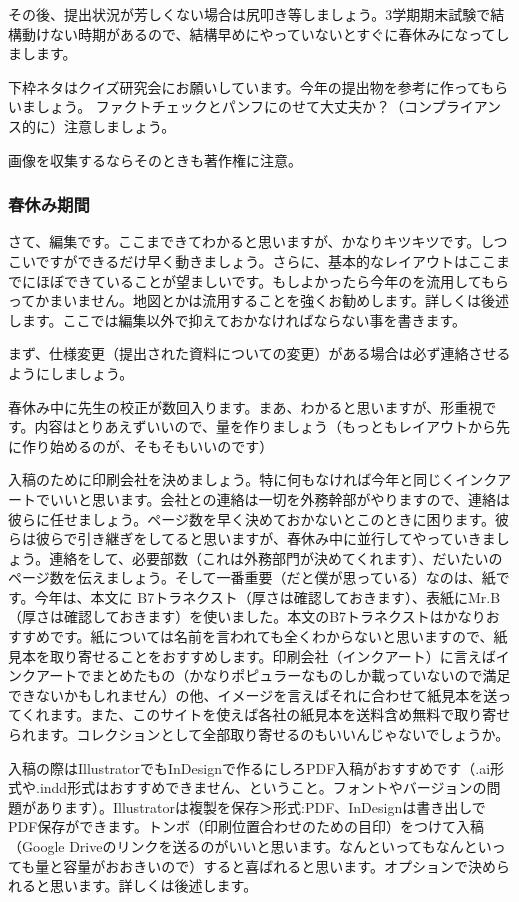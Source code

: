 \documentclass[dvipdfmx,jb5]{jarticle}
\begin{document}
その後、提出状況が芳しくない場合は尻叩き等しましょう。3学期期末試験で結構動けない時期があるので、結構早めにやっていないとすぐに春休みになってしまします。

下枠ネタはクイズ研究会にお願いしています。今年の提出物を参考に作ってもらいましょう。
ファクトチェックとパンフにのせて大丈夫か？（コンプライアンス的に）注意しましょう。

画像を収集するならそのときも著作権に注意。

\subsubsection{春休み期間}
さて、編集です。ここまできてわかると思いますが、かなりキツキツです。しつこいですができるだけ早く動きましょう。さらに、基本的なレイアウトはここまでにほぼできていることが望ましいです。もしよかったら今年のを流用してもらってかまいません。地図とかは流用することを強くお勧めします。詳しくは後述します。ここでは編集以外で抑えておかなければならない事を書きます。

まず、仕様変更（提出された資料についての変更）がある場合は必ず連絡させるようにしましょう。

春休み中に先生の校正が数回入ります。まあ、わかると思いますが、形重視です。内容はとりあえずいいので、量を作りましょう（もっともレイアウトから先に作り始めるのが、そもそもいいのです）

入稿のために印刷会社を決めましょう。特に何もなければ今年と同じくインクアートでいいと思います。会社との連絡は一切を外務幹部がやりますので、連絡は彼らに任せましょう。ページ数を早く決めておかないとこのときに困ります。彼らは彼らで引き継ぎをしてると思いますが、春休み中に並行してやっていきましょう。連絡をして、必要部数（これは外務部門が決めてくれます）、だいたいのページ数を伝えましょう。そして一番重要（だと僕が思っている）なのは、紙です。今年は、本文に B7トラネクスト（厚さは確認しておきます）、表紙にMr.B（厚さは確認しておきます）を使いました。本文のB7トラネクストはかなりおすすめです。紙については名前を言われても全くわからないと思いますので、紙見本を取り寄せることをおすすめします。印刷会社（インクアート）に言えばインクアートでまとめたもの（かなりポピュラーなものしか載っていないので満足できないかもしれません）の他、イメージを言えばそれに合わせて紙見本を送ってくれます。また、このサイトを使えば各社の紙見本を送料含め無料で取り寄せられます。コレクションとして全部取り寄せるのもいいんじゃないでしょうか。

入稿の際はIllustratorでもInDesignで作るにしろPDF入稿がおすすめです（.ai形式や.indd形式はおすすめできません、ということ。フォントやバージョンの問題があります）。Illustratorは複製を保存＞形式:PDF、InDesignは書き出しでPDF保存ができます。トンボ（印刷位置合わせのための目印）をつけて入稿（Google Driveのリンクを送るのがいいと思います。なんといってもなんといっても量と容量がおおきいので）すると喜ばれると思います。オプションで決められると思います。詳しくは後述します。
\end{document}
